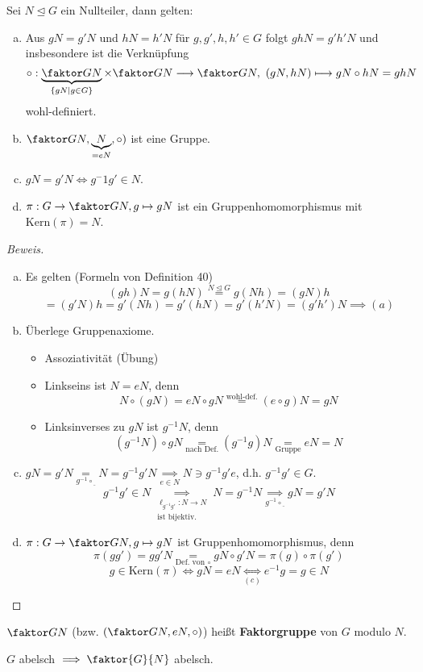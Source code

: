 \documentclass[a4paper]{report}
\begin{document}
\begin{satz}
  Sei $N \trianglelefteq G$ ein Nullteiler, dann gelten:
  \begin{enumerate}[(a)]
    \item Aus $gN = g'N$ und $hN = h'N$ für $g, g', h, h' \in G$ folgt $ghN = g'h'N$ und insbesondere ist die Verknüpfung $$\circ : \underbrace{\faktor GN}_{\{gN \mid g \in G\}} \times \faktor GN \longrightarrow \faktor GN,\  (gN, hN) \longmapsto gN \circ hN = ghN$$
          wohl-definiert.
    \item $\faktor GN, \underbrace{N}_{=eN}, \circ)$ ist eine Gruppe.
    \item $gN = g'N \iff g^-1g' \in N$.
    \item $\pi : G \to \faktor GN, g \mapsto gN$ ist ein Gruppenhomomorphismus mit $\mathrm{Kern}(\pi) = N$.
  \end{enumerate}
\begin{proof}[Beweis]
\begin{enumerate}[(a)]
  \item Es gelten (Formeln von Definition 40)
        $$(gh)N = g(hN) \overset{N \trianglelefteq G}= g(Nh) = (gN)h$$
        $$= (g'N)h = g'(Nh) = g'(hN) = g'(h'N) = (g'h')N \implies (a)$$
  \item Überlege Gruppenaxiome.
\begin{itemize}
  \item Assoziativität (Übung)
  \item Linkseins ist $N = eN$, denn
        $$N \circ(gN) = eN\circ gN \overset{\text{wohl-def.}} = (e \circ g)N = gN$$
  \item Linksinverses zu $gN$ ist $g^{-1}N$, denn
        $$(g^{-1}N)\circ gN \underset{\text{nach Def.}}= (g^{-1}g)N \underset{\text{Gruppe}}= eN = N$$
\end{itemize}
  \item  $gN = g'N \underset{g^{-1}\circ \underline{\ }}= N = g^{-1}g'N \underset{e \in N}\implies N \ni g^{-1}g'e$, d.h. $g^{-1}g' \in G$.
        $$g^{-1}g' \in N \underset{\substack{\ell_{g^{-1}g'} : N \to N\\ \text{ist bijektiv.}}}\implies N = g^{-1}N \underset{g^{-1}\circ \underline{\ }}\implies gN= g'N$$
  \item $\pi : G \to \faktor GN, g \mapsto gN$ ist Gruppenhomomorphismus, denn $$\pi(gg') = gg'N \underset{\text{Def. von } \circ} = gN \circ g'N = \pi(g)\circ \pi(g')$$
        $$g \in \mathrm{Kern}(\pi) \iff gN = eN \underset{(c)}\iff e^{-1}g = g \in N$$
\end{enumerate}
\end{proof}
\end{satz}
\begin{bem*}[Bezeichnung] $\faktor GN$ (bzw. $(\faktor GN, eN, \circ)$) heißt \textbf{Faktorgruppe} von $G$ modulo $N$.
\end{bem*}
\begin{bem*}[Übung]
$G$ abelsch $\implies \faktor{G}{N}$ abelsch.
\end{bem*}
\end{document}
